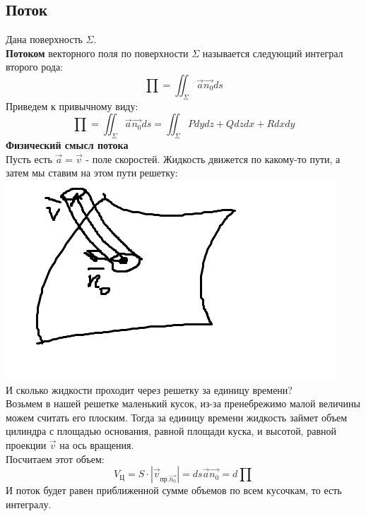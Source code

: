 \documentclass[12pt]{article}
\begin{document}
\subsection{Поток}
Дана поверхность $\Sigma$.\\
\textbf{Потоком} векторного поля по поверхности $\Sigma$ называется следующий интеграл второго рода:\\
$$\prod = \iint_{\Sigma} \overrightarrow{a} \overrightarrow{n_0} ds$$
Приведем к привычному виду:\\
$$\prod = \iint_{\Sigma} \overrightarrow{a} \overrightarrow{n_0} ds = \iint_{\Sigma} Pdydz + Qdzdx + Rdxdy$$
\textbf{Физический смысл потока}\\
Пусть есть $\overrightarrow{a} = \overrightarrow{v}$ - поле скоростей. Жидкость движется по какому-то пути, а затем мы ставим на этом пути решетку:\\
\includegraphics{currentPhysicDefinition}\\
И сколько жидкости проходит через решетку за единицу времени?\\
Возьмем в нашей решетке маленький кусок, из-за пренебрежимо малой величины можем считать его плоским. Тогда за единицу времени жидкость займет объем цилиндра с площадью основания, равной площади куска, и высотой, равной проекции $\overrightarrow{v}$ на ось вращения.\\
Посчитаем этот объем:\\
$$V_{\text{Ц}} = S \cdot |\overrightarrow{v}_{\text{пр.} \overrightarrow{n_0}}| = ds \overrightarrow{a} \overrightarrow{n_0} = d\prod$$
И поток будет равен приближенной сумме объемов по всем кусочкам, то есть интегралу.\\
\end{document}
